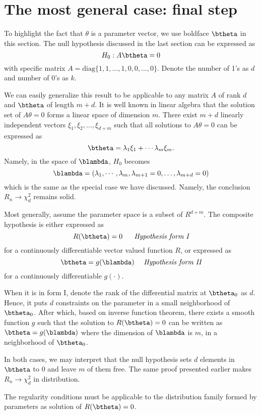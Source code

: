 \section{ The most general case: final step}

To highlight the fact that $\theta$ is a parameter vector,
we use boldface $\btheta$ in this section.
The null hypothesis discussed in the last section can be expressed as
\[
H_0:   A \btheta = 0
\]
with specific matrix $A = \mbox{diag} \{1, 1, \ldots, 1, 0, 0,\ldots, 0\}$.
Denote the number of 1's as $d$ and number of 0's as $k$.

We can easily generalize this result to be applicable to any matrix $A$
of rank $d$ and $\btheta$ of length $m+d$.
It is well known in linear algebra that the solution set of $A \theta = 0$
forms a linear space of dimension $m$.
There exist $m+d$ linearly independent vectors $\xi_1, \xi_2, \ldots, \xi_{d+m}$
such that all solutions to $A \theta = 0$ can be expressed as
\[
\btheta = \lambda_1 \xi_1 + \cdots \lambda_m \xi_m.
\]
Namely, in the space of $\blambda$, $H_0$ becomes
\[
\blambda = (\lambda_1, \cdots, \lambda_m, \lambda_{m+1}=0, \ldots, \lambda_{m+d}=0)
\]
which is the same as the special case we have discussed.
Namely, the conclusion
$
R_n \to \chi_d^2
$
remains solid.

Most generally, assume the parameter space is a subset of
$R^{d+m}$.  The composite hypothesis is either expressed as
\[
R(\btheta) = 0 \mbox{~~~~ {\it Hypothesis form I}}
\]
for a continuously differentiable vector valued function $R$,
or expressed as
\[
\btheta = g(\blambda)   \mbox{~~~~{\it Hypothesis form II}}
\]
for a continuously differentiable $g(\cdot)$.

When it is in form I, denote the rank of the differential matrix
at $\btheta_0$ as $d$. Hence, it puts $d$ constraints on
the parameter in a small neighborhood of $\btheta_0$.
After which,  based on inverse function theorem, there exists a
smooth function $g$ such that the solution to $R(\btheta) = 0$
can be written as $\btheta = g(\blambda)$ where 
the dimension of $\blambda$ is $m$, in a neighborhood of $\btheta_0$.

In both cases, we may interpret that
the null hypothesis sets $d$ elements in $\btheta$ to $0$
and leave $m$ of them free. 
The same proof presented earlier makes
$
R_n \to \chi_d^2
$
in distribution.

\vs
The regularity conditions must be applicable to
the distribution family formed by parameters
as solution of $R(\btheta) = 0$.


